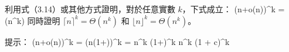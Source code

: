 利用式（3.14）或其他方式證明，對於任意實數 $k$，下式成立：
\startformula
(n+o(n))^k = \Theta(n^k)
\stopformula
同時證明 $\lceil n\rceil^k = \Theta(n^k)$ 和 $\lfloor n\rfloor^k = \Theta(n^k)$。
\stopEXERCISE

\startANSWER
提示：
\startsplitformula\startmathalignment
\NC (n+o(n))^k \NC = (n(1+))^k \NR
\NC \NC = n^k (1+)^k \NR
\NC \NC \ge n^k (1 + c)^k \NR
\stopmathalignment\stopsplitformula
\stopANSWER
